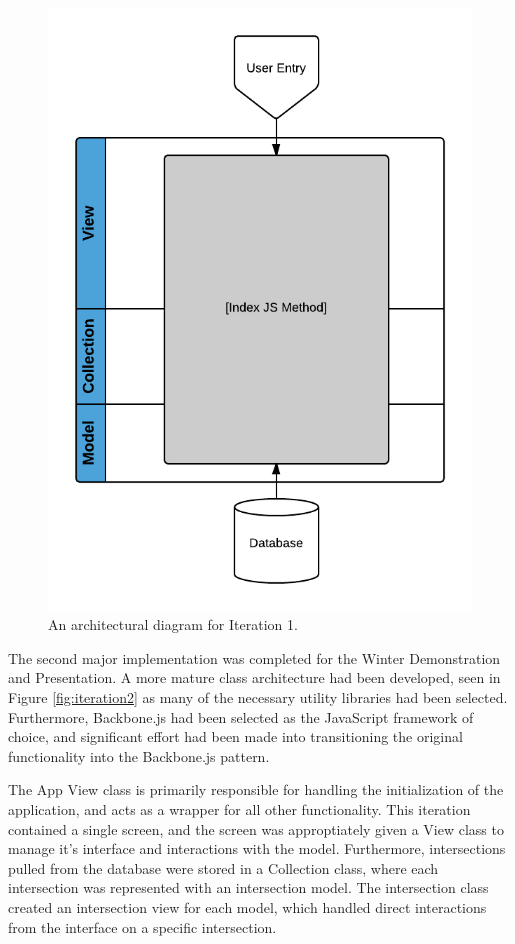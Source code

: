 \documentclass{report}
\begin{document}
\begin{figure}[htbp!]
  \begin{centering}
    \includegraphics[scale=0.25]{figures/Iteration-1.png}
    \caption{An architectural diagram for Iteration 1.}
    \label{fig:iteration1}
  \end{centering}
\end{figure}

The second major implementation was completed for the Winter Demonstration and Presentation. A more mature class architecture had been developed, seen in Figure \ref{fig:iteration2} as many of the necessary utility libraries had been selected. Furthermore, Backbone.js had been selected as the JavaScript framework of choice, and significant effort had been made into transitioning the original functionality into the Backbone.js pattern.

The App View class is primarily responsible for handling the initialization of the application, and acts as a wrapper for all other functionality. This iteration contained a single screen, and the screen was approptiately given a View class to manage it's interface and interactions with the model. Furthermore, intersections pulled from the database were stored in a Collection class, where each intersection was represented with an intersection model. The intersection class created an intersection view for each model, which handled direct interactions from the interface on a specific intersection. 
\end{document}
